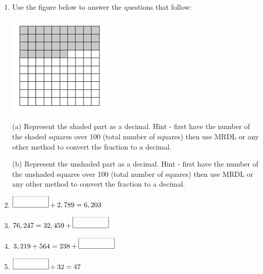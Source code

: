 \documentclass{article}
\begin{document}
\begin{enumerate}

\item \quad  Use the figure below to answer the questions that follow: 

\includegraphics[width=5cm]{Year_6_Mixed_Tests/Homework_Tasks/Shaded_grid_1.png}

(a) Represent the shaded part as a decimal. Hint - first have the number of the shaded squares over 100 (total number of squares) then use MRDL or any other method to convert the fraction to a decimal.  


(b) Represent the unshaded part as a decimal. Hint - first have the number of the unshaded squares over 100 (total number of squares) then use MRDL or any other method to convert the fraction to a decimal. 




\item \quad \( \framebox(50,15){} + 2,789 = 6,203 \)

\item \quad \( 76,247 = 32,459 + \framebox(50,15){} \)

\item \quad \( 3,219 + 564 = 238 + \framebox(50,15){} \)

\item \quad \( \framebox(50,15){} \div 32 = 47  \)


\end{enumerate}
\end{document}
